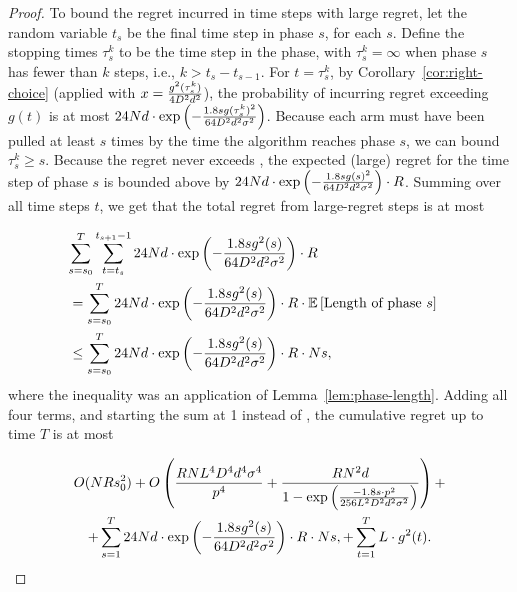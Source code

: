 \begin{proof}
To bound the regret incurred in time steps with large regret,
let the random variable $t_s$ be the final time step in phase $s$,
for each $s$.
Define the stopping times $\tau_{s}^{k}$ to be the 
time step in the  phase,
with $\tau_{s}^{k} = \infty$ when phase $s$ has fewer than $k$ steps,
i.e., $k > t_{s}-t_{s-1}$.
For $t = \tau_{s}^{k}$, by Corollary~\ref{cor:right-choice}
(applied with $x = \frac{g^2(\tau_s^k)}{4 D^2 d^2}$),
the probability of incurring regret exceeding $g(t)$ is at most
$24 N d \cdot \exp\left(-\frac{1.8 s g(\tau_{s}^{k})^2}{64 D^2 d^2\sigma^2}\right)$.
Because each arm must have been pulled at least $s$ times by the time
the algorithm reaches phase $s$,
we can bound $\tau_{s}^{k} \geq s$.
Because the regret never exceeds \MAXR,
the expected (large) regret for the  time step of phase $s$
is bounded above by
$24 N d \cdot \exp\left(-\frac{1.8 s g(s)^2}{64 D^2 d^2\sigma^2}\right) \cdot R$.
Summing over all time steps $t$, we get that the total regret from
large-regret steps is at most

\begin{align*}
\lefteqn{\sum_{s = \LatePhase}^T \sum_{t=t_s}^{t_{s+1}-1}
  24 \ARMNUM d \cdot \exp\left(-\frac{1.8 s g^2(s)}{64 \Diam^2 d^2\sigma^2}\right) \cdot \MAXR}
\\ & =
\sum_{s = \LatePhase}^T 
  24 \ARMNUM d \cdot \exp\left(-\frac{1.8 s g^2(s)}{64 \Diam^2 d^2\sigma^2}\right) \cdot \MAXR
  \cdot \Expect{\mbox{Length of phase } s}
\\ & \leq
\sum_{s = \LatePhase}^T 
  24 \ARMNUM d \cdot \exp\left(-\frac{1.8 s g^2(s)}{64 \Diam^2 d^2\sigma^2}\right) \cdot \MAXR
  \cdot \ARMNUM s,
\end{align*}
where the inequality was an application of Lemma~\ref{lem:phase-length}.
Adding all four terms, and starting the sum at 1 instead of \LatePhase,
the cumulative regret up to time $T$ is at most

\begin{multline*}
O(N R s_0^2) + 
O \left( \frac{R N L^4 D^4 d^4 \sigma^4}{p^4}
  + \frac{R N^2 d}{1 - \exp \left(
    \frac{-1.8 s \cdot p^2}{256 L^2 D^2 d^2 \sigma^2}
  \right)} \right) +
\\
+ \sum_{s = 1}^T 
  24 N d \cdot \exp\left(-\frac{1.8 s g^2(s)}{64 D^2 d^2\sigma^2}\right) \cdot R
  \cdot N s,
+ \sum_{t=1}^{T}L \cdot g^2(t).
\end{multline*}


\end{proof}

